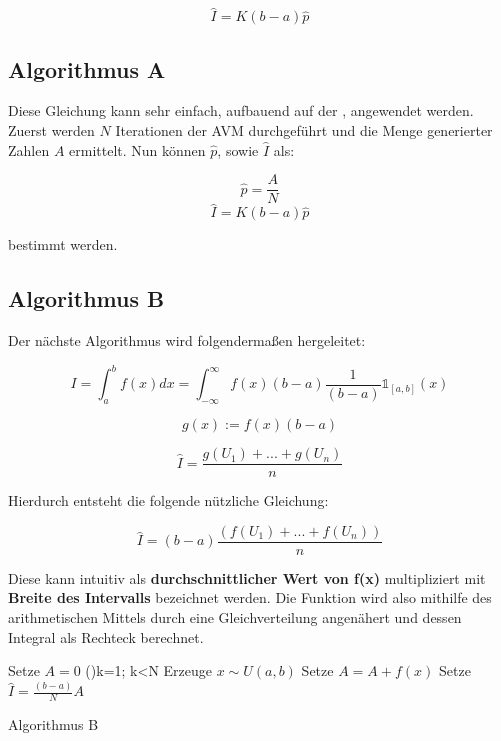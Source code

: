 \[\hat{I} = K(b-a)\hat{p}\]

\subsection{Algorithmus A}

Diese Gleichung kann sehr einfach, 
aufbauend auf der ,
angewendet werden.
Zuerst werden $N$ Iterationen der AVM durchgeführt und die Menge generierter Zahlen $A$ ermittelt.
Nun können $\hat{p}$, sowie $\hat{I}$ als: 

\[\hat{p} = \frac{A}{N}\]
\[\hat{I} = K(b-a)\hat{p}\]

bestimmt werden.

\subsection{Algorithmus B}

Der nächste Algorithmus wird folgendermaßen hergeleitet:

\[I = \int_a^b f(x)dx = 
\int_{-\infty}^\infty f(x)(b-a)
\frac{1}{(b-a)}\mathds{1}_{[a,b]}(x)\]

\[g(x) := f(x)(b-a)\]

\[\hat{I} = \frac{g(U_1) + ... + g(U_n)}{n}\]

Hierdurch entsteht die folgende nützliche Gleichung:

\[\hat{I} = (b-a)\frac{(f(U_1) + ... + f(U_n))}{n}\]

Diese kann intuitiv als \textbf{durchschnittlicher Wert von f(x)} multipliziert mit \textbf{Breite des Intervalls} bezeichnet werden.
Die Funktion wird also mithilfe des arithmetischen Mittels durch eine Gleichverteilung angenähert und dessen Integral als Rechteck berechnet.



\begin{algorithm}[h!]
    \DontPrintSemicolon
    \LinesNumbered
    
    Setze $A=0$\;
    \For(){k=1; k<N}{
      Erzeuge $x\sim U(a,b)$\;
      Setze $A=A+f(x)$\;
    }
    Setze $\hat{I} = \frac{(b-a)}{N}A$
    
    
    \caption{Algorithmus B}\label{algo:algo-b}
\end{algorithm}




